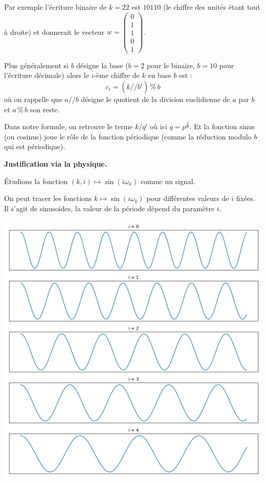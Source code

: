 \documentclass[11pt,class=report,crop=false]{standalone}
\begin{document}
Par exemple l'écriture binaire de $k=22$ est $10110$ (le chiffre des unités étant tout à droite) et donnerait le vecteur $w = \left(\begin{smallmatrix}0 \\ 1 \\ 1 \\ 0 \\ 1 \end{smallmatrix}\right)$.

Plus généralement si $b$ désigne la base ($b=2$ pour le binaire, $b=10$ pour l'écriture décimale) alors le $i$-ème chiffre de $k$ en base $b$ est :
\[
c_i = (k /\!/ b^i) \, \% \, b
\]
où on rappelle que $a /\!/ b$ désigne le quotient de la division euclidienne de $a$ par $b$ et $a \, \% \, b$ son reste.

Dans notre formule, on retrouve le terme $k / q^i$ où ici $q = p^{\frac{2}{n}}$. Et la fonction sinus (ou cosinus) joue le rôle de la fonction périodique (comme la réduction modulo $b$ qui est périodique).

\bigskip


\textbf{Justification via la physique.}

Étudions la fonction $(k,i) \mapsto \sin( i \omega_k)$ comme un signal.

On peut tracer les fonctions $k \mapsto \sin( i \omega_k)$ pour différentes valeurs de $i$ fixées. Il s'agit de sinusoïdes, la valeur de la période dépend du paramètre $i$.

\begin{center}
	\includegraphics[scale=\myscale,scale=0.4]{figures/position-icst}
\end{center}
\end{document}
